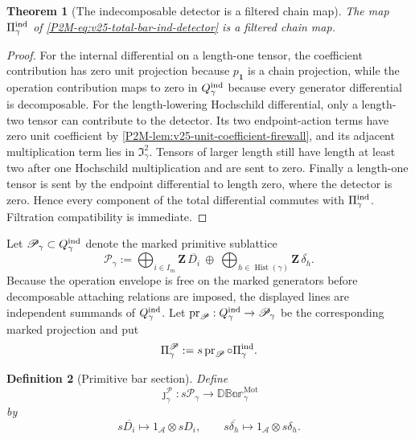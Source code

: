 \documentclass[11pt]{article}
\newtheorem{theorem}{Theorem}[section]
\newtheorem{definition}[theorem]{Definition}
\theoremstyle{remark}
\newcommand{\Z}{\mathbf Z}
\newcommand{\Mot}{\mathrm{Mot}}
\begin{document}
\begin{theorem}[The indecomposable detector is a filtered chain map]
\label{P2M-thm:v25-ind-detector-chain-map}
The map \(\Pi_\gamma^{\rm ind}\) of
\eqref{P2M-eq:v25-total-bar-ind-detector} is a filtered chain map.
\end{theorem}

\begin{proof}
For the internal differential on a length-one tensor, the coefficient
contribution has zero unit projection because \(p_{\mathbf1}\) is a chain
projection, while the operation contribution maps to zero in
\(Q_\gamma^{\rm ind}\) because every generator differential is decomposable.
For the length-lowering Hochschild differential, only a length-two tensor can
contribute to the detector.  Its two endpoint-action terms have zero unit
coefficient by \cref{P2M-lem:v25-unit-coefficient-firewall}, and its adjacent
multiplication term lies in \(\mathfrak I_\gamma^2\).  Tensors of larger
length still have length at least two after one Hochschild multiplication and
are sent to zero.  Finally a length-one tensor is sent by the endpoint
differential to length zero, where the detector is zero.  Hence every component
of the total differential commutes with \(\Pi_\gamma^{\rm ind}\).
Filtration compatibility is immediate.
\end{proof}

Let \(\mathscr P_\gamma\subset Q_\gamma^{\rm ind}\) denote the marked primitive
sublattice
\begin{equation}
 \boxed{
 \mathscr P_\gamma
 :=
 \bigoplus_{i\in I_m}\Z\,\overline{D_i}
 \ \oplus\
 \bigoplus_{h\in\operatorname{Hist}(\gamma)}
 \Z\,\overline{\delta_h}.}
\end{equation}
Because the operation envelope is free on the marked generators before
decomposable attaching relations are imposed, the displayed lines are
independent summands of \(Q_\gamma^{\rm ind}\).  Let
\(\operatorname{pr}_{\mathscr P}:Q_\gamma^{\rm ind}\to\mathscr P_\gamma\)
be the corresponding marked projection and put
\[
 \Pi_\gamma^{\mathscr P}
 :=
 s\operatorname{pr}_{\mathscr P}\circ\Pi_\gamma^{\rm ind}.
\]

\begin{definition}[Primitive bar section]
\label{P2M-def:v25-primitive-bar-section}
Define
\begin{equation}
 \jmath_\gamma^{\mathscr P}:
 s\mathscr P_\gamma
 \longrightarrow
 \mathbb{DBar}_\gamma^{\Mot}
\end{equation}
by
\[
 s\overline{D_i}\longmapsto1_{\mathscr A}\otimes sD_i,
 \qquad
 s\overline{\delta_h}\longmapsto1_{\mathscr A}\otimes s\delta_h.
\]
\end{definition}
\end{document}

